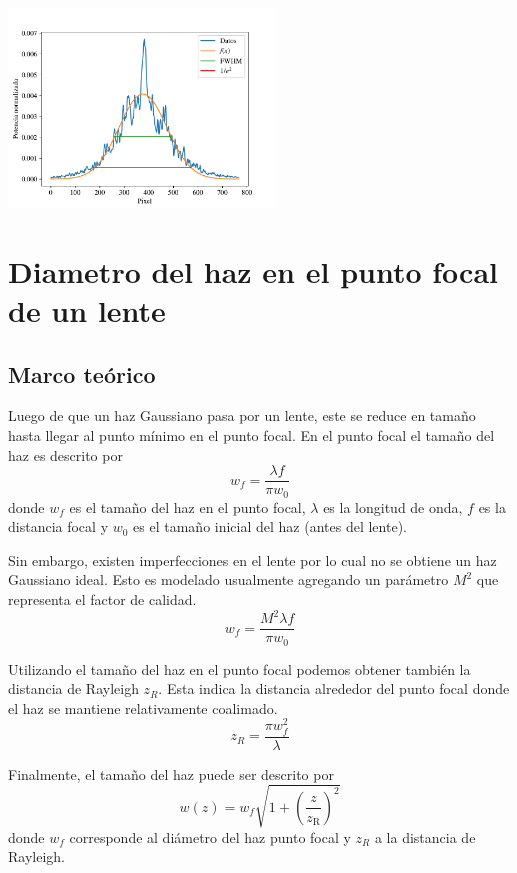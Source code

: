 \documentclass[onecolumn]{article}
\begin{document}
		\begin{center}
			\includegraphics[width=200pt]{img/plot-FibraCintura.pdf}
			\label{cintura_2}
		\end{center}
	
	\section{Diametro del haz en el punto focal de un lente}
		\subsection{Marco teórico}
		Luego de que un haz Gaussiano pasa por un lente, este se reduce en tamaño hasta llegar al punto mínimo en el punto focal. En el punto focal el tamaño del haz es descrito por
		$$
			w_f=\frac{\lambda f}{\pi w_0}
		$$
		donde $w_f$ es el tamaño del haz en el punto focal, $\lambda$ es la longitud de onda, $f$ es la distancia focal y $w_0$ es el tamaño inicial del haz (antes del lente).

		Sin embargo, existen imperfecciones en el lente por lo cual no se obtiene un haz Gaussiano ideal. Esto es modelado usualmente agregando un parámetro $M^2$ que representa el factor de calidad.
		\begin{equation}
			w_f=\frac{M^2 \lambda f}{\pi w_0}
		\label{focal_width}
		\end{equation}

		Utilizando el tamaño del haz en el punto focal podemos obtener también la distancia de Rayleigh $z_R$. Esta indica la distancia alrededor del punto focal donde el haz se mantiene relativamente coalimado.
		$$
			z_R=\frac{\pi w_f^2}{\lambda}
		$$

		Finalmente, el tamaño del haz puede ser descrito por
		\begin{equation}
			w(z)=w_f \sqrt{1+\left(\frac{z}{z_{\mathrm{R}}}\right)^2}
		\label{beamwidth}
		\end{equation}
		donde $w_f$ corresponde al diámetro del haz punto focal y $z_R$ a la distancia de Rayleigh.
\end{document}

